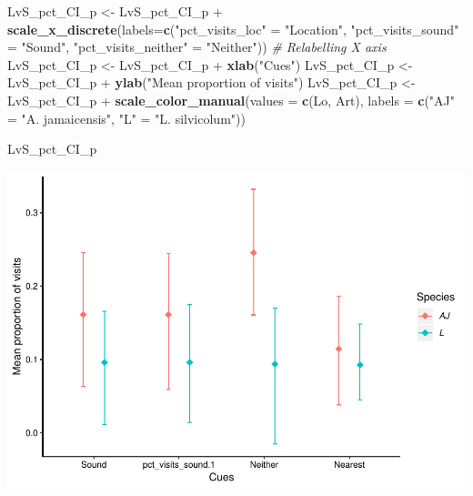 \documentclass[]{article}
\newenvironment{Shaded}{\begin{snugshade}}{\end{snugshade}}
\newcommand{\KeywordTok}[1]{\textcolor[rgb]{0.13,0.29,0.53}{\textbf{{#1}}}}
\newcommand{\DataTypeTok}[1]{\textcolor[rgb]{0.13,0.29,0.53}{{#1}}}
\newcommand{\StringTok}[1]{\textcolor[rgb]{0.31,0.60,0.02}{{#1}}}
\newcommand{\CommentTok}[1]{\textcolor[rgb]{0.56,0.35,0.01}{\textit{{#1}}}}
\newcommand{\NormalTok}[1]{{#1}}
\begin{document}
\begin{Shaded}
\begin{Highlighting}[]
\NormalTok{LvS_pct_CI_p <-}\StringTok{ }\NormalTok{LvS_pct_CI_p +}\StringTok{ }\KeywordTok{scale_x_discrete}\NormalTok{(}\DataTypeTok{labels=}\KeywordTok{c}\NormalTok{(}\StringTok{"pct_visits_loc"} \NormalTok{=}\StringTok{ "Location"}\NormalTok{, }\StringTok{"pct_visits_sound"} \NormalTok{=}\StringTok{ "Sound"}\NormalTok{,}
                              \StringTok{"pct_visits_neither"} \NormalTok{=}\StringTok{ "Neither"}\NormalTok{))  }\CommentTok{# Relabelling X axis}
\NormalTok{LvS_pct_CI_p <-}\StringTok{ }\NormalTok{LvS_pct_CI_p +}\StringTok{ }\KeywordTok{xlab}\NormalTok{(}\StringTok{"Cues"}\NormalTok{)}
\NormalTok{LvS_pct_CI_p <-}\StringTok{ }\NormalTok{LvS_pct_CI_p +}\StringTok{ }\KeywordTok{ylab}\NormalTok{(}\StringTok{"Mean proportion of visits"}\NormalTok{)}
\NormalTok{LvS_pct_CI_p <-}\StringTok{ }\NormalTok{LvS_pct_CI_p +}\StringTok{ }\KeywordTok{scale_color_manual}\NormalTok{(}\DataTypeTok{values =} \KeywordTok{c}\NormalTok{(Lo, Art), }\DataTypeTok{labels =} \KeywordTok{c}\NormalTok{(}\StringTok{"AJ"} \NormalTok{=}\StringTok{ "A. jamaicensis"}\NormalTok{, }\StringTok{"L"} \NormalTok{=}\StringTok{ "L. silvicolum"}\NormalTok{))}


\NormalTok{LvS_pct_CI_p                    }
\end{Highlighting}
\end{Shaded}

\includegraphics{Sensory_learning_files/figure-latex/unnamed-chunk-20-1.pdf}
\end{document}
